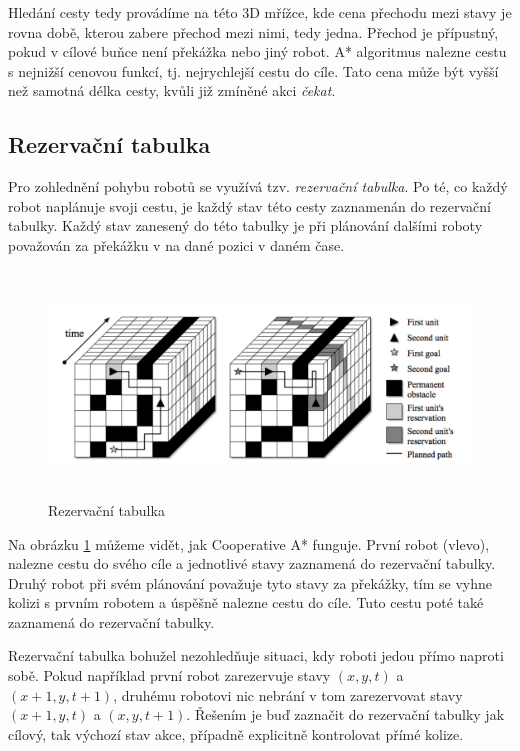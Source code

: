Hledání cesty tedy provádíme na této 3D mřížce, kde cena přechodu mezi stavy je rovna době, kterou zabere přechod mezi nimi, tedy jedna. Přechod je přípustný, pokud v cílové buňce není překážka nebo jiný robot.
A* algoritmus nalezne cestu s nejnižší cenovou funkcí, tj. nejrychlejší cestu do cíle. Tato cena může být vyšší než samotná délka cesty, kvůli již zmíněné akci \emph{čekat}. 

\subsection{Rezervační tabulka}\label{sec:reservationTable}

Pro zohlednění pohybu robotů se využívá tzv. \emph{rezervační tabulka}. Po té, co každý robot naplánuje svoji cestu, je každý stav této cesty zaznamenán do rezervační tabulky. Každý stav zanesený do této tabulky je při plánování dalšími roboty považován za překážku v na dané pozici v daném čase. 

\begin{figure}[htb]
	\begin{center}
		\includegraphics*[width=15cm,height=6cm,keepaspectratio]{obr/reservationTable}
	\end{center}
	\caption[caption]{Rezervační tabulka \cite{Silver2006}}
	\label{obr:reservationTable}
\end{figure}

Na obrázku \ref{obr:reservationTable} můžeme vidět, jak Cooperative A* funguje. První robot (vlevo), nalezne cestu do svého cíle a jednotlivé stavy zaznamená do rezervační tabulky. Druhý robot při svém plánování považuje tyto stavy za překážky, tím se vyhne kolizi s prvním robotem a úspěšně nalezne cestu do cíle. Tuto cestu poté také zaznamená do rezervační tabulky.

Rezervační tabulka bohužel nezohledňuje situaci, kdy roboti jedou přímo naproti sobě. Pokud například první robot zarezervuje stavy $\left(x,y,t\right)$ a $\left(x+1,y,t+1\right)$, druhému robotovi nic nebrání v tom zarezervovat stavy $\left(x+1,y,t\right)$ a $\left(x,y,t+1\right)$. Řešením je buď zaznačit do rezervační tabulky jak cílový, tak výchozí stav akce, případně explicitně kontrolovat přímé kolize.

